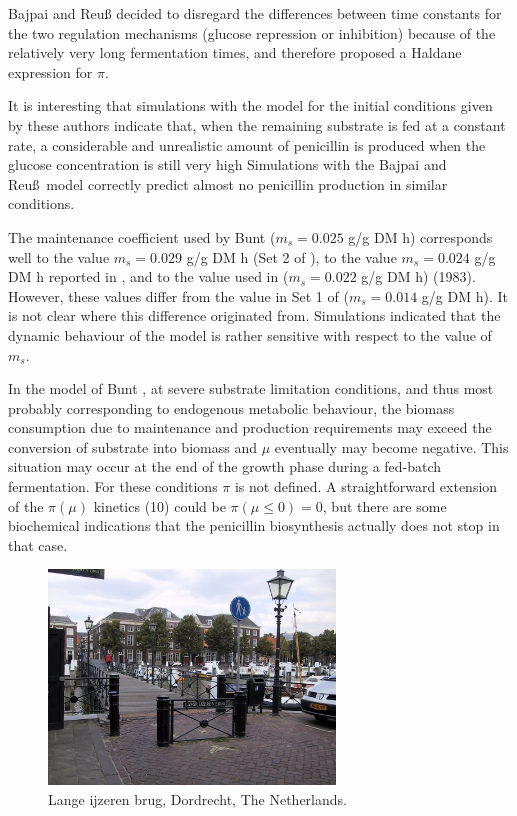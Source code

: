 \documentclass{river-journal}
\begin{document}
Bajpai and Reu{\ss} decided to disregard the
differences between time constants for the two regulation mechanisms
(glucose repression or inhibition) because of the
relatively very long fermentation times, and therefore proposed a Haldane
expression for $\pi$.

It is interesting that simulations with the \cite{Bunt} model for the
initial conditions given by these authors indicate that, when the
remaining substrate is fed at a constant rate, a considerable and
unrealistic amount of penicillin is
produced when the glucose concentration is still very high \cite{CarberryCL88}
Simulations with the Bajpai and Reu\ss\ model correctly predict almost
no penicillin production in similar conditions.


The maintenance coefficient used by Bunt \cite{Bunt}
($m_{s}=0.025$ g/g DM h) corresponds well to
the value $m_{s}=0.029$ g/g DM h (Set 2 of \cite{BuchananRBES}), to the
value $m_{s}=0.024$ g/g DM h reported in \cite{MMI2-d3}, and to the
value used in \cite{CawseyIJMMS} ($m_{s}=0.022$ g/g DM h) (1983).
However, these values differ from the value in Set 1 of
\cite{BuchananRBES} ($m_{s}=0.014$ g/g DM h).
It is not clear where this difference originated from.
Simulations indicated that the dynamic behaviour of the model is rather
sensitive with respect to the value of $m_{s}$.

In the model of Bunt \cite{Bunt}, at severe substrate limitation
conditions, and thus most probably corresponding to endogenous
metabolic behaviour, the biomass consumption due to maintenance and
production requirements may exceed the conversion of substrate into
biomass and $\mu$ eventually may become negative. This situation may
occur at the end of the growth phase during a fed-batch
fermentation.  For these conditions $\pi$ is not defined. A
straightforward extension of the $\pi(\mu)$ kinetics (10) could be
$\pi(\mu \leq 0)=0$, but there are some biochemical indications that
the penicillin biosynthesis actually does not stop in that case.

\begin{figure}
\centerline{\includegraphics[width=3in]{bridge}}
\caption[]{Lange ijzeren brug, Dordrecht, The Netherlands.}%
\label{bridge}
\end{figure}
\end{document}
